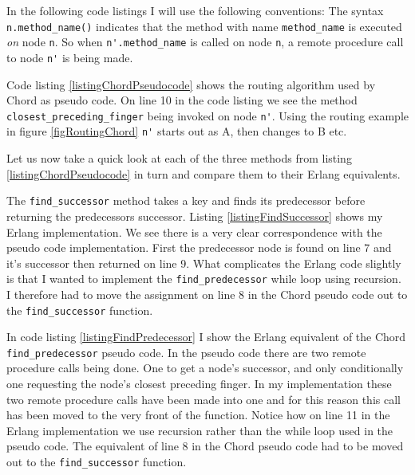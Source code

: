 In the following code listings I will use the following conventions:
The syntax \verb=n.method_name()= indicates that the method with name \verb=method_name= is executed \emph{on} node \verb=n=. So when \verb=n'.method_name= is called on node \verb=n=, a remote procedure call to node \verb=n'= is being made.

Code listing \ref{listingChordPseudocode} shows the routing algorithm used by Chord as pseudo code. On line 10 in the code listing we see the method \verb=closest_preceding_finger= being invoked on node \verb=n'=. Using the routing example in figure \ref{figRoutingChord} \verb=n'= starts out as A, then changes to B etc.



Let us now take a quick look at each of the three methods from listing \ref{listingChordPseudocode} in turn and compare them to their Erlang equivalents.

The \verb=find_successor= method takes a key and finds its predecessor before returning the predecessors successor.
Listing \ref{listingFindSuccessor} shows my Erlang implementation.
We see there is a very clear correspondence with the pseudo code implementation. First the predecessor node is found on line 7 and it's successor then returned on line 9.
What complicates the Erlang code slightly is that I wanted to implement the \verb=find_predecessor= while loop using recursion. I therefore had to move the assignment on line 8 in the Chord pseudo code out to the \verb=find_successor= function.



In code listing \ref{listingFindPredecessor} I show the Erlang equivalent of the Chord \verb=find_predecessor= pseudo code. 
In the pseudo code there are two remote procedure calls being done. One to get a node's successor, and only conditionally one requesting the node's closest preceding finger.
In my implementation these two remote procedure calls have been made into one and for this reason this call has been moved to the very front of the function.
Notice how on line 11 in the Erlang implementation we use recursion rather than the while loop used in the pseudo code. The equivalent of line 8 in the Chord pseudo code had to be moved out to the \verb=find_successor= function.



